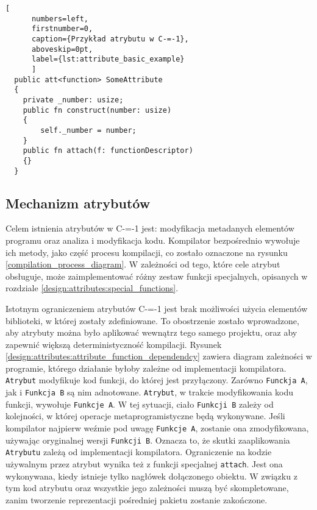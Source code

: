 \begin{minipage}{\linewidth}
  
	\begin{lstlisting}[
	  numbers=left,
	  firstnumber=0,
	  caption={Przykład atrybutu w C-=-1},
	  aboveskip=0pt,
	  label={lst:attribute_basic_example}
	  ]
  public att<function> SomeAttribute
  {
	private _number: usize;
	public fn construct(number: usize)
	{
		self._number = number;
	}
	public fn attach(f: functionDescriptor)
	{}
  }
  \end{lstlisting}
  \end{minipage}
\subsection{Mechanizm atrybutów}
\label{Attributes_mechanism_cm1}

Celem istnienia atrybutów w C-=-1 jest: modyfikacja metadanych elementów programu oraz analiza i modyfikacja kodu.
Kompilator bezpośrednio wywołuje ich metody, jako część procesu kompilacji, co zostało oznaczone na rysunku \ref{compilation_process_diagram}.
W zależności od tego, które cele atrybut obsługuje, może zaimplementować różny zestaw funkcji specjalnych, opisanych w rozdziale \ref{design:attributes:special_functions}.

Istotnym ograniczeniem atrybutów C-=-1 jest brak możliwości użycia elementów biblioteki, w której zostały zdefiniowane.
To obostrzenie zostało wprowadzone, aby atrybuty można było aplikować wewnątrz tego samego projektu, oraz aby zapewnić większą deterministyczność kompilacji.
Rysunek \ref{design:attributes:attribute_function_dependendcy} zawiera diagram zależności w programie, którego działanie byłoby zależne od implementacji kompilatora.
\lstinline{Atrybut} modyfikuje kod funkcji, do której jest przyłączony.
Zarówno \lstinline{Funckja A}, jak i \lstinline{Funkcja B} są nim adnotowane.
\lstinline{Atrybut}, w trakcie modyfikowania kodu funkcji, wywołuje \lstinline{Funkcje A}.
W tej sytuacji, ciało \lstinline{Funkcji B} zależy od kolejności, w której operacje metaprogramistyczne będą wykonywane.
Jeśli kompilator najpierw weźmie pod uwagę \lstinline{Funkcje A}, zostanie ona zmodyfikowana, używając oryginalnej wersji \lstinline{Funkcji B}.
Oznacza to, że skutki zaaplikowania \lstinline{Atrybutu} zależą od implementacji kompilatora.
Ograniczenie na kodzie używalnym przez atrybut wynika też z funkcji specjalnej \lstinline{attach}.
Jest ona wykonywana, kiedy istnieje tylko nagłówek dołączonego obiektu.
W związku z tym kod atrybutu oraz wszystkie jego zależności muszą być skompletowane, zanim tworzenie reprezentacji pośredniej pakietu zostanie zakończone.

